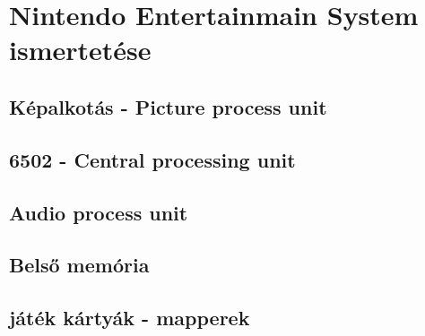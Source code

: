 \chapter{Nintendo Entertainmain System ismertetése}

\section{Képalkotás - Picture process unit}

\section{6502 - Central processing unit}

\section{Audio process unit}

\section{Belső memória}

\section{játék kártyák - mapperek}